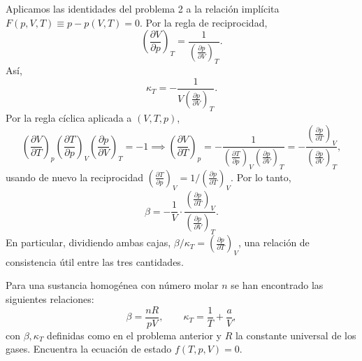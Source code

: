 \documentclass[12pt,a4paper]{article}
\newcommand{\pd}[3]{\left(\frac{\partial #1}{\partial #2}\right)_{#3}}
\begin{document}
    \begin{solucion}
        Aplicamos las identidades del problema 2 a la relación implícita
        $F(p,V,T)\equiv p-p(V,T)=0$. Por la regla de reciprocidad,
        \begin{equation*}
            \pd{V}{p}{T}=\frac{1}{\pd{p}{V}{T}}.
        \end{equation*}
        Así,
        \begin{equation*}
            \boxed{\kappa_{T}=-\frac{1}{V\pd{p}{V}{T}}.}
        \end{equation*}
        Por la regla cíclica aplicada a $(V,T,p)$,
        \begin{equation*}
            \pd{V}{T}{p}\pd{T}{p}{V}\pd{p}{V}{T}=-1
            \implies
            \pd{V}{T}{p}=-\frac{1}{\pd{T}{p}{V}\pd{p}{V}{T}}
            =-\frac{\pd{p}{T}{V}}{\pd{p}{V}{T}},
        \end{equation*}
        usando de nuevo la reciprocidad $\pd{T}{p}{V}=1/\pd{p}{T}{V}$. Por lo tanto,
        \begin{equation*}
            \boxed{\beta=-\frac{1}{V}\cdot\frac{\pd{p}{T}{V}}{\pd{p}{V}{T}}.}
        \end{equation*}
        En particular, dividiendo ambas cajas, $\beta/\kappa_{T}=\pd{p}{T}{V}$, una relación de
        consistencia útil entre las tres cantidades.
    \end{solucion}

    \begin{problema}
        Para una sustancia homogénea con número molar $n$ se han encontrado las siguientes
        relaciones:
        \begin{equation*}
            \beta=\frac{nR}{pV}, \qquad \kappa_{T}=\frac{1}{T}+\frac{a}{V},
        \end{equation*}
        con $\beta,\kappa_{T}$ definidas como en el problema anterior y $R$ la constante
        universal de los gases. Encuentra la ecuación de estado $f(T,p,V)=0$.
    \end{problema}
\end{document}
